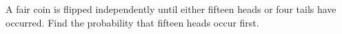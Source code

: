 A fair coin is flipped independently until either fifteen heads or four tails have occurred. Find the probability that fifteen heads occur first.
